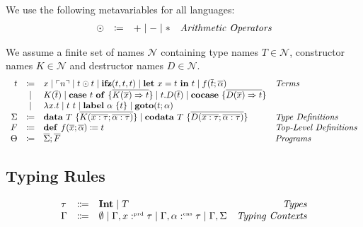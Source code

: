 \begin{definition}
  We use the following metavariables for all languages:
  \[
    \begin{array}{rcll}
      \odot  & \coloneqq & + \mid - \mid * & \emph{Arithmetic Operators}
    \end{array}
  \]
\end{definition}

\begin{definition}
  We assume a finite set of names $\mathcal{N}$ containing type names $T\in\mathcal{N}$, constructor names $K\in\mathcal{N}$ and destructor names $D\in\mathcal{N}$.
  \[ 
    \begin{array}{r c l l}
      t & \coloneqq & x \mid \ulcorner n \urcorner \mid t \odot t \mid \mathbf{ifz}(t, t, t) \mid \mathbf{let}\ x = t\ \mathbf{in}\ t \mid f(\overline{t}; \overline{\alpha}) & \emph{Terms}\\
      & \mid & K(\overline{t}) \mid \mathbf{case}\ t\ \mathbf{of}\ \{ \overline{K(\overline{x}) \Rightarrow t} \} \mid t.D(\overline{t}) \mid \mathbf{cocase}\ \{ \overline{D(\overline{x}) \Rightarrow t} \} & \\
      & \mid & \lambda x.t \mid t\ t \mid \mathbf{label}\ \alpha\ \{t \} \mid \mathbf{goto}(t; \alpha) & \\
      \Sigma & \coloneqq & \mathbf{data}\ T\ \{ \overline{K(\overline{x:\tau};\overline{\alpha:\tau})} \} \mid \mathbf{codata}\ T\ \{ \overline{D(\overline{x:\tau};\overline{\alpha:\tau})}\} & \emph{Type Definitions}\\
      F & \coloneqq & \mathbf{def}\ f(\overline{x};\overline{\alpha}) \coloneq t & \emph{Top-Level Definitions}\\
      \Theta & \coloneqq & \overline{\Sigma};\overline{F} & \emph{Programs}\\
    \end{array}
  \]
\end{definition}

\subsection{Typing Rules}
\label{subsec:fun:typing-rules}

\begin{definition}
\[
  \begin{array}{l c l r}
    \tau   & \Coloneqq & \mathbf{Int} \mid T & \emph{Types}\\
    \Gamma & \Coloneqq & \emptyset \mid \Gamma, x :^{\text{\tiny prd}} \tau \mid \Gamma, \alpha :^{\text{\tiny cns}} \tau \mid \Gamma, \Sigma& \emph{Typing Contexts}
  \end{array}
\]
\end{definition}

